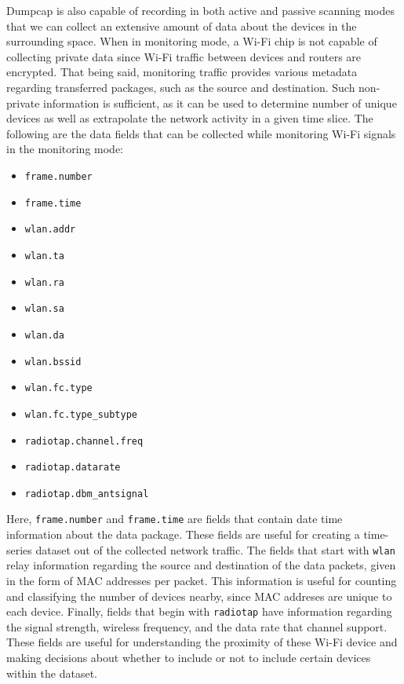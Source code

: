 \documentclass[journal, 12pt]{IEEEtran}
\begin{document}
\noindent Dumpcap is also capable of recording in both active and passive scanning modes that we can collect an extensive amount of data about the devices in the surrounding space. When in monitoring mode, a Wi-Fi chip is not capable of collecting private data since Wi-Fi traffic between devices and routers are encrypted. That being said, monitoring traffic provides various metadata regarding transferred packages, such as the source and destination. Such non-private information is sufficient, as it can be used to determine number of unique devices as well as extrapolate the network activity in a given time slice. The following are the data fields that can be collected while monitoring Wi-Fi signals in the monitoring mode:
\begin{itemize}
    \item \texttt{frame.number}
    \item \texttt{frame.time}
    \item \texttt{wlan.addr}
    \item \texttt{wlan.ta}
    \item \texttt{wlan.ra}
    \item \texttt{wlan.sa}
    \item \texttt{wlan.da}
    \item \texttt{wlan.bssid}
    \item \texttt{wlan.fc.type}
    \item \texttt{wlan.fc.type\_subtype}
    \item \texttt{radiotap.channel.freq}
    \item \texttt{radiotap.datarate}
    \item \texttt{radiotap.dbm\_antsignal}
\end{itemize}
\medskip
\noindent Here, \texttt{frame.number} and \texttt{frame.time} are fields that contain date time information about the data package. These fields are useful for creating a time-series dataset out of the collected network traffic. The fields that start with \texttt{wlan} relay information regarding the source and destination of the data packets, given in the form of MAC addresses per packet. This information is useful for counting and classifying the number of devices nearby, since MAC addreses are unique to each device. Finally, fields that begin with \texttt{radiotap} have information regarding the signal strength, wireless frequency, and the data rate that channel support. These fields are useful for understanding the proximity of these Wi-Fi device and making decisions about whether to include or not to include certain devices within the dataset.
\end{document}
